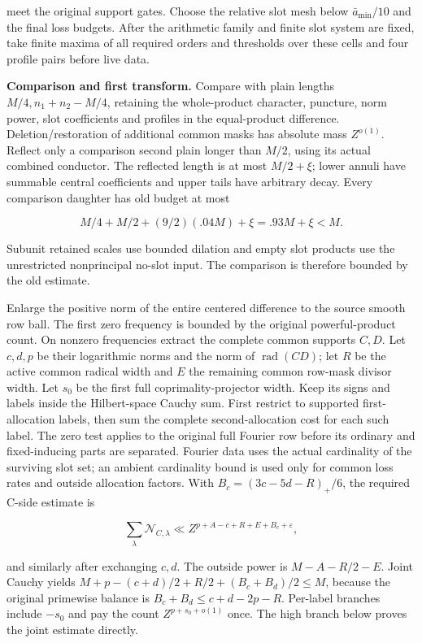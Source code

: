 \documentclass[11pt,a4paper]{article}
\begin{document}
meet the original support gates. Choose the relative slot mesh below
\(\bar a_{\min}/10\) and the final loss budgets. After the arithmetic
family and finite slot system are fixed, take finite maxima of all
required orders and thresholds over these cells and four profile pairs
before live data.

\textbf{Comparison and first transform.} Compare with plain lengths
\(M/4,n_1+n_2-M/4\), retaining the whole-product character, puncture,
norm power, slot coefficients and profiles in the equal-product
difference. Deletion/restoration of additional common masks has absolute
mass \(Z^{o(1)}\). Reflect only a comparison second plain longer than
\(M/2\), using its actual combined conductor. The reflected length is at
most \(M/2+\xi\); lower annuli have summable central coefficients and
upper tails have arbitrary decay. Every comparison daughter has old
budget at most

\[
M/4+M/2+(9/2)(.04M)+\xi=.93M+\xi<M.
\tag{2.12}
\]

Subunit retained scales use bounded dilation and empty slot products use
the unrestricted nonprincipal no-slot input. The comparison is therefore
bounded by the old estimate.

Enlarge the positive norm of the entire centered difference to the
source smooth row ball. The first zero frequency is bounded by the
original powerful-product count. On nonzero frequencies extract the
complete common supports \(C,D\). Let \(c,d,p\) be their logarithmic
norms and the norm of \(\operatorname{rad}(CD)\); let \(R\) be the
active common radical width and \(E\) the remaining common row-mask
divisor width. Let \(s_0\) be the first full coprimality-projector
width. Keep its signs and labels inside the Hilbert-space Cauchy sum.
First restrict to supported first-allocation labels, then sum the
complete second-allocation cost for each such label. The zero test
applies to the original full Fourier row before its ordinary and
fixed-inducing parts are separated. Fourier data uses the actual
cardinality of the surviving slot set; an ambient cardinality bound is
used only for common loss rates and outside allocation factors. With
\(B_c=(3c-5d-R)_+/6\), the required C-side estimate is

\[
\sum_{\lambda}\mathcal N_{C,\lambda}
 \ll Z^{p+A-c+R+E+B_c+\varepsilon},
\tag{2.13}
\]

and similarly after exchanging \(c,d\). The outside power is
\(M-A-R/2-E\). Joint Cauchy yields \(M+p-(c+d)/2+R/2+(B_c+B_d)/2\le M\),
because the original primewise balance is \(B_c+B_d\le c+d-2p-R\).
Per-label branches include \(-s_0\) and pay the count \(Z^{p+s_0+o(1)}\)
once. The high branch below proves the joint estimate directly.
\end{document}
